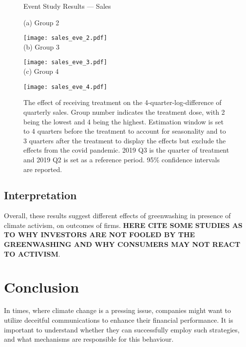 \documentclass[12pt]{article}
\begin{document}
\begin{figure}
    \caption{Event Study Results --- Sales}
    \centering
    
    (a) Group 2
    
    \texttt{[image: sales\_eve\_2.pdf]} \\
    
    (b) Group 3
    
    \texttt{[image: sales\_eve\_3.pdf]} \\
    
    (c) Group 4
    
    \texttt{[image: sales\_eve\_4.pdf]}
    
    \captionsetup{font=footnotesize}
    \caption*{The effect of receiving treatment on the 4-quarter-log-difference of quarterly sales. Group number indicates the treatment dose, with 2 being the lowest and 4 being the highest. Estimation window is set to 4 quarters before the treatment to account for seasonality and to 3 quarters after the treatment to display the effects but exclude the effects from the covid pandemic. 2019 Q3 is the quarter of treatment and 2019 Q2 is set as a reference period. 95\% confidence intervals are reported.}
\end{figure}

\subsection{Interpretation}

Overall, these results suggest different effects of greenwashing in presence of climate activism, on outcomes of firms. \textbf{HERE CITE SOME STUDIES AS TO WHY INVESTORS ARE NOT FOOLED BY THE GREENWASHING AND WHY CONSUMERS MAY NOT REACT TO ACTIVISM}.

\newpage


\section{Conclusion}\label{sect:discussion}

In times, where climate change is a pressing issue, companies might want to utilize deceitful communications to enhance their financial performance. It is important to understand whether they can successfully employ such strategies, and what mechanisms are responsible for this behaviour. 
\end{document}
